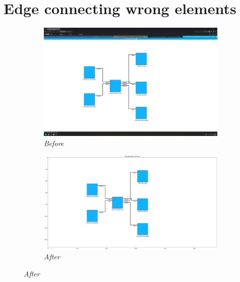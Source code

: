 \documentclass{article}
\begin{document}
\section{Edge connecting wrong elements}
\begin{figure}[H]
    \centering
    \begin{subfigure}[t]{0.9\textwidth}
        \centering
        \includegraphics[width=\textwidth]{testcases/edge_connecting_wrong_elements/151304-831674_input_image.png}
        \caption*{\textit{Before}}
    \end{subfigure}
    \newline    
    \begin{subfigure}[t]{0.9\textwidth}
        \centering
        \includegraphics[width=\textwidth]{testcases/edge_connecting_wrong_elements/151317-638937_element_bbox_errors_labeled_colored.png}
        \caption*{\textit{After}}
    \end{subfigure}
    \label{fig:edge_connecting_wrong}
\end{figure}
\newpage
\end{document}
